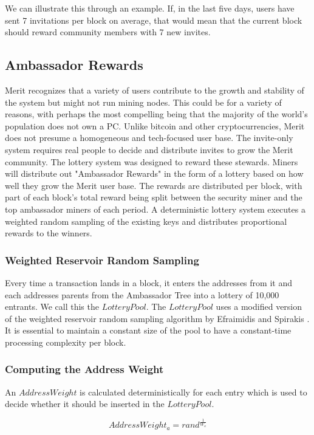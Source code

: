 \documentclass{article}
\begin{document}
We can illustrate this through an example.  If, in the last five days, users have sent 7 invitations
per block on average, that would mean that the current block should reward community members with 7 new invites.  

\subsection{Ambassador Rewards}

Merit recognizes that a variety of users contribute to the growth and stability
of the system but might not run mining nodes. This could be for a variety of reasons, with 
perhaps the most compelling being that the majority of the world's population does not own a PC.  Unlike bitcoin and other
cryptocurrencies, Merit does not presume a homogeneous and tech-focused user base. The invite-only
system requires real people to decide and distribute invites to grow the Merit community.
The lottery system was designed to reward these stewards. Miners will distribute
out "Ambassador Rewards" in the form of a lottery based on how well
they grow the Merit user base. The rewards are distributed per block, with part of each block's total 
reward being split between the security miner and the top ambassador miners of each period.  
A deterministic lottery system executes a weighted random sampling
of the existing keys and distributes proportional rewards to the winners.

\subsubsection{Weighted Reservoir Random Sampling}
Every time a transaction lands in a block, it enters the addresses from it and
each addresses parents from the Ambassador Tree into a lottery of 10,000 entrants.
We call this the $LotteryPool$. The $LotteryPool$ uses a modified version of the
weighted reservoir random sampling algorithm by Efraimidis and Spirakis \cite{eframspirakis}.
It is essential to maintain a constant size of the pool to have a constant-time
processing complexity per block.

\subsubsection{Computing the Address Weight}
An $AddressWeight$ is calculated deterministically for each entry which is used
to decide whether it should be inserted in the $LotteryPool$.

$$AddressWeight_a = rand^{\frac{1}{W_a}}$$
\end{document}
